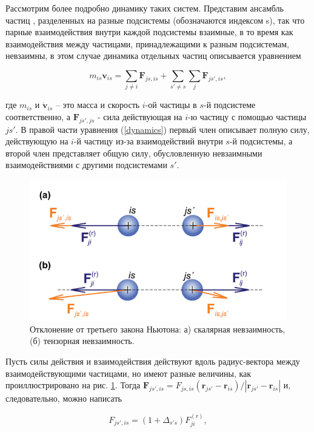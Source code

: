 Рассмотрим более подробно динамику таких систем.
Представим ансамбль частиц \cite{10.1039/c8sm01836g}, разделенных на разные
подсистемы (обозначаются индексом s), так что парные взаимодействия
внутри каждой подсистемы взаимные, в то время как взаимодействия
между частицами, принадлежащими к разным подсистемам, невзаимны, в этом случае динамика отдельных частиц описывается
уравнением

\begin{equation}\label{dynamics}
   m_{is} \textbf{\.{v}}_{is} = \sum_{j \neq i}\textbf{F}_{js,is} + \sum_{s' \neq s}\sum_{j}\textbf{F}_{js',is},
\end{equation}

где $m_{is}$ и $\dot{\textbf{v}}_{is}$ -- 
это масса и скорость $i$-ой
частицы в $s$-й подсистеме соответственно, а $\textbf{F}_{js',js}$ - сила
действующая на $i$-ю частицу с помощью частицы $js'$. В правой части уравнения (\ref{dynamics}) первый член описывает полную силу, действующую
на $i$-й частицу из-за взаимодействий внутри $s$-й подсистемы, а второй член представляет общую силу, обусловленную
невзаимными взаимодействиями с другими подсистемами $s'$.\\

\begin{figure}[htbp]
\centerline{\includegraphics[width=0.7\linewidth]{Ris/1.jpg}}
\caption{Отклонение от третьего закона Ньютона: а) скалярная невзаимность, (б) тензорная 
невзаимность.}
\label{Ivlev}
\end{figure}

Пусть силы действия и взаимодействия действуют вдоль радиус-вектора между
взаимодействующими частицами, но имеют разные величины, как
проиллюстрировано на рис. \ref{Ivlev}.  Тогда $\textbf{F}_{js',is} = F_{js,is} (\textbf{r}_{js'} - \textbf{r}_{is})/|\textbf{r}_{js'} - \textbf{r}_{is}|$ и, следовательно, можно написать

\begin{equation}\label{second}
    F_{js',is} = (1 + \Delta_{s's})F^{(r)}_{ji},
\end{equation}


